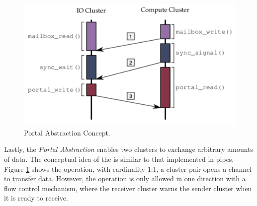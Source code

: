 			\begin{figure}[h]
				\centering
				\includegraphics[width=.7\textwidth]{images/conceptual-sync.png}

				\caption{
					Portal Abstraction Concept.
				}\par
				\label{fig.conpt_portal}
			\end{figure}

			Lastly, the \textit{Portal Abstraction} enables two clusters to exchange arbitrary
			amounts of data.
			The conceptual idea of ​​the \portal is similar to that implemented in \posix pipes.
			Figure \ref{fig.conpt_portal} shows the \portal operation, with cardinality
			1:1, a cluster pair opens a channel to transfer data.
			However, the operation is only allowed in one direction with a flow control mechanism,
			where the receiver cluster warns the sender cluster when it is ready to receive.

